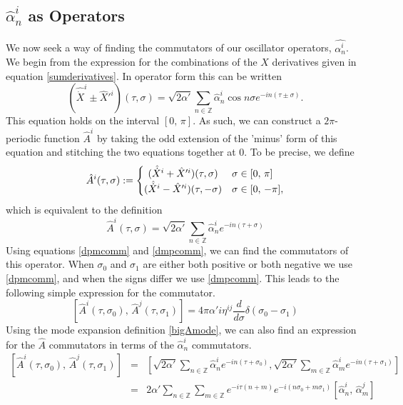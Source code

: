 \documentclass[a4paper,12pt]{article}
\numberwithin{equation}{section}
\begin{document}
\subsection{$\hat{\alpha}_n^i$ as Operators}
We now seek a way of finding the commutators of our oscillator operators, $\hat{\alpha_n^i}$. We begin from the expression for the combinations of the $X$ derivatives given in equation \ref{sumderivatives}. In operator form this can be written
\begin{equation}
(\hat{\dot{X}}^i\pm\hat{X}'^i)(\tau,\sigma) = \sqrt{2\alpha'}\sum_{n \in \mathbb{Z}} \hat{\alpha}_n^i\cos n\sigma e^{-in(\tau\pm\sigma)}.
\end{equation}
This equation holds on the interval $[0,\,\pi]$. As such, we can construct a $2\pi$-periodic function $\hat{A}^i$ by taking the odd extension of the 'minus' form of this equation and stitching the two equations together at 0. To be precise, we define
\begin{equation}
\hat{A}^i(\tau,\sigma) := \left\{\def\arraystretch{1.2}%
\begin{array}{@{}c@{\quad}l@{}}
(\hat{\dot{X}}^i +\hat{X}'^i)(\tau,\sigma)& \sigma \in [0,\,\pi]\\
(\hat{\dot{X}}^i -\hat{X}'^i)(\tau,-\sigma)&\sigma \in [0,\,-\pi],
\end{array}
\right.
\end{equation} 
which is equivalent to the definition
\begin{equation}\label{bigAmode}
\hat{A}^i(\tau,\sigma) = \sqrt{2\alpha'}\sum_{n \in \mathbb{Z}}\hat{\alpha}_n^ie^{-in(\tau + \sigma)}
\end{equation}
Using equations \ref{dpmcomm} and \ref{dmpcomm}, we can find the commutators of this operator. When $\sigma_0$ and $\sigma_1$ are either both positive or both negative we use \ref{dpmcomm}, and when the signs differ we use \ref{dmpcomm}. This leads to the following simple expression for the commutator.
\begin{equation}\label{acomm}
\left[\hat{A}^i(\tau,\sigma_0),\,\hat{A}^j(\tau,\sigma_1)\right] = 4\pi\alpha'i\eta^{i j} \frac{d}{d\sigma}\delta(\sigma_0-\sigma_1)
\end{equation}
Using the mode expansion definition \ref{bigAmode}, we can also find an expression for the $\hat{A}$ commutators in terms of the $\hat{\alpha}_n^i$ commutators.
\begin{eqnarray*}
\left[\hat{A}^i(\tau,\sigma_0),\,\hat{A}^j(\tau,\sigma_1)\right] &=& \left[\sqrt{2\alpha'}\sum_{n \in \mathbb{Z}}\hat{\alpha}_n^ie^{-in(\tau + \sigma_0)},\sqrt{2\alpha'}\sum_{m \in \mathbb{Z}}\hat{\alpha}_m^ie^{-in(\tau + \sigma_1)}\right]\\
&=&2\alpha'\sum_{n \in \mathbb{Z}}\sum_{m\in\mathbb{Z}}e^{-i\tau(n+m)}e^{-i(n\sigma_0 + m\sigma_1)}\left[\hat{\alpha}_n^i,\,\hat{\alpha}_m^j\right]
\end{eqnarray*}
\end{document}

